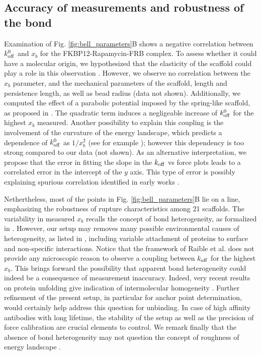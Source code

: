 \documentclass{biophys-new}
\begin{document}
\subsection*{Accuracy of measurements and robustness of the bond}

Examination of Fig. \ref{fig:bell_parameters}B shows a negative correlation between $k^0_{\rm off}$ and $x_b$ for the FKBP12-Rapamycin-FRB complex. To assess whether it could have a molecular origin, we hypothesized that the elasticity of the scaffold could play a role in this observation \cite{walton2008}. However, we observe no correlation between the $x_b$ parameter, and the mechanical parameters of the scaffold, length and persistence length, as well as bead radius (data not shown). Additionally, we computed the effect of a parabolic potential imposed by the spring-like scaffold, as proposed in \cite{friddle2012}. The quadratic term induces a negligeable increase of $k^0_{\rm off}$ for the highest $x_b$ measured. Another possibility to explain this coupling is the involvement of the curvature of the energy landscape, which predicts a dependence of $k^0_{\rm off}$ as $1/x_b^2$ (see for example \cite{hummer2003}); however this dependency is too strong compared to our data (not shown). As an alternative interpretation, we propose that the error in fitting the slope in the $k_{\rm off}$ vs force plots leads to a correlated error in the intercept of the $y$ axis. This type of error is possibly explaining spurious correlation identified in early works \cite{schwesinger2000}. 

Nethertheless, most of the points in Fig. \ref{fig:bell_parameters}B lie on a line, emphasizing the robustness of rupture characteristics among 21 scaffolds.
The variability in measured $x_b$ recalls the concept of bond heterogeneity, as formalized in \cite{raible2006}. However, our setup may removes many possible environmental causes of heterogeneity, as listed in \cite{raible2006}, including variable attachment of proteins to surface and non-specific interactions. Notice that the framework of Raible et al. does not provide any microscopic reason to observe a coupling between $k_{\rm off}$ for the highest $x_b$. This brings forward the possibility that apparent bond heterogeneity could indeed be a consequence of measurement inaccuracy. Indeed, very recent results on protein unfolding give indication of intermolecular homogeneity \cite{xia2022}. Further refinement of the present setup, in particular for anchor point determination, would certainly help address this question for unbinding.
In case of high affinity antibodies with long lifetime, the stability of the setup as well as the precision of force calibration are crucial elements to control.
We remark finally that the absence of bond heterogeneity may not question the concept of roughness of energy landscape \cite{rico2007, robert2011, limozin2016}.
\end{document}
